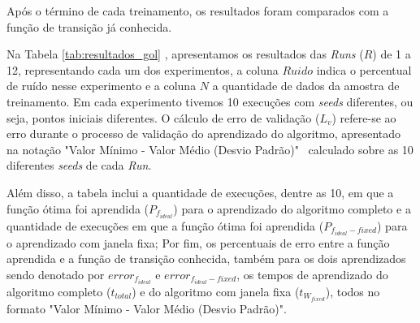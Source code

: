 Após o término de cada treinamento, os resultados foram comparados com a função de transição já conhecida.

Na Tabela \ref{tab:resultados_gol} , apresentamos os resultados das \textit{Runs} ($R$) de 1 a 12, representando cada um dos experimentos, a coluna $Ruido$ indica o percentual de ruído nesse experimento e a coluna $N$ a quantidade de dados da amostra de treinamento. Em cada experimento tivemos 10 execuções com \textit{seeds} diferentes, ou seja, pontos iniciais diferentes. O cálculo de erro de validação ($L_{v}$) refere-se ao erro durante o processo de validação do aprendizado do algoritmo, apresentado na notação "Valor Mínimo - Valor Médio (Desvio Padrão)" \ calculado sobre as 10 diferentes \textit{seeds} de cada \textit{Run}.

Além disso, a tabela inclui a quantidade de execuções, dentre as 10, em que a função ótima foi aprendida ($P_{f_{ideal}}$) para o aprendizado do algoritmo completo e a quantidade de execuções em que a função ótima foi aprendida ($P_{f_{ideal}-fixed}$) para o aprendizado com janela fixa; Por fim, os percentuais de erro entre a função aprendida e a função de transição conhecida, também para os dois aprendizados sendo denotado por $error_{f_{ideal}}$ e $error_{f_{ideal}-fixed}$, os tempos de aprendizado do algoritmo completo ($t_{total}$) e do algoritmo com janela fixa ($t_{W_{fixed}}$), todos no formato "Valor Mínimo - Valor Médio (Desvio Padrão)".

